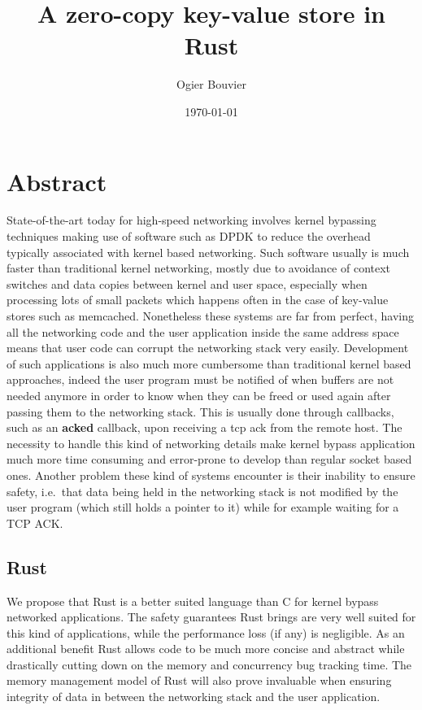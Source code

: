 \documentclass[11pt]{article}
\author{Ogier Bouvier}
\date{\today}
\title{A zero-copy key-value store in Rust}
\begin{document}
\maketitle
{}
\tableofcontents
\newpage

\setcounter{page}{1}
\section{Abstract}
State-of-the-art today for high-speed networking involves kernel
bypassing techniques making use of software such as DPDK to reduce the
overhead typically associated with kernel based networking. Such
software usually is much faster than traditional kernel networking,
mostly due to avoidance of context switches and data copies between
kernel and user space, especially when processing lots of small
packets which  happens often in the case of key-value stores such as
memcached. Nonetheless these systems are far from perfect, having all
the  networking code and the user application inside the same address
space means that user code can corrupt the networking stack very
easily. Development of such applications is also much more cumbersome
than traditional kernel based approaches, indeed the user program must
be notified of when buffers are not needed anymore in order to know
when they can be freed or used again after passing them to the
networking stack. This is usually done through callbacks, such as an
\textbf{acked} callback, upon receiving a tcp ack from the remote
host. The necessity to handle this kind of networking details make
kernel bypass application much more time consuming and error-prone to
develop than regular socket based ones. Another problem these kind of
systems encounter is their inability to ensure safety, i.e.\ that data
being held in the networking stack is not modified by the user program
(which still holds a pointer to it) while for example waiting for a
TCP ACK.

\subsection{Rust}
We propose that Rust is a better suited language than C for kernel
bypass networked applications. The safety guarantees Rust
brings are very well suited for this kind of applications, while the
performance loss (if any) is negligible. As an additional benefit Rust
allows code to be much more concise and abstract while drastically
cutting down on the memory and concurrency bug tracking time. The
memory management model of Rust will also prove invaluable when
ensuring integrity of data in between the networking stack and the
user application.
\end{document}
